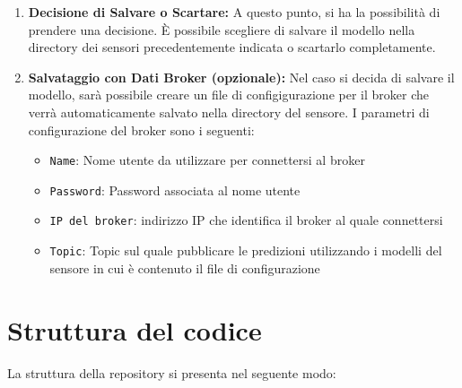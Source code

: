 \documentclass[a4paper,10pt]{article}
\begin{document}
\begin{enumerate}
  \item \textbf{Decisione di Salvare o Scartare:} A questo punto, si ha la possibilità di prendere una decisione. 
  È possibile scegliere di salvare il modello nella directory dei sensori precedentemente indicata o scartarlo completamente.
  
  \item \textbf{Salvataggio con Dati Broker (opzionale):} Nel caso si decida di salvare il modello, sarà possibile creare un file di configigurazione 
  per il broker che verrà automaticamente salvato nella directory del sensore.  I parametri di configurazione del broker sono i seguenti:
  
  \begin{itemize}
    \item \texttt{Name}: Nome utente da utilizzare per connettersi al broker
    \item \texttt{Password}: Password associata al nome utente
    \item \texttt{IP del broker}: indirizzo IP che identifica il broker al quale connettersi
    \item \texttt{Topic}: Topic sul quale pubblicare le predizioni utilizzando i modelli del sensore in cui è contenuto il file di configurazione
  \end{itemize}
\end{enumerate}

\section{Struttura del codice}
La struttura della repository si presenta nel seguente modo:

\end{document}
